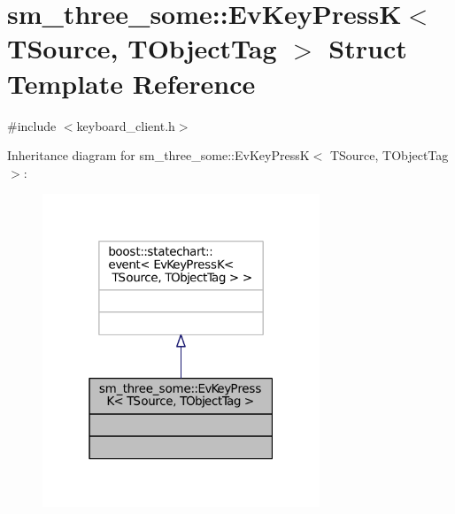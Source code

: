 \hypertarget{structsm__three__some_1_1EvKeyPressK}{}\section{sm\+\_\+three\+\_\+some\+:\+:Ev\+Key\+PressK$<$ T\+Source, T\+Object\+Tag $>$ Struct Template Reference}
\label{structsm__three__some_1_1EvKeyPressK}


{\ttfamily \#include $<$keyboard\+\_\+client.\+h$>$}



Inheritance diagram for sm\+\_\+three\+\_\+some\+:\+:Ev\+Key\+PressK$<$ T\+Source, T\+Object\+Tag $>$\+:
\nopagebreak
\begin{figure}[H]
\begin{center}
\leavevmode
\includegraphics[width=235pt]{structsm__three__some_1_1EvKeyPressK__inherit__graph}
\end{center}
\end{figure}



